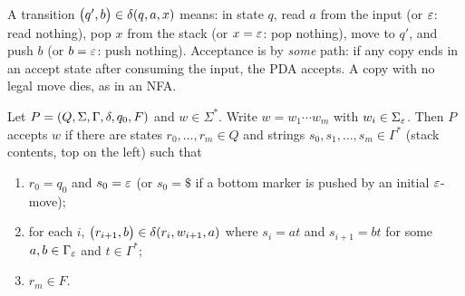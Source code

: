 A transition $\bigl(q',b\bigr)\in\delta(q,a,x)$ means: in state $q$, read
$a$ from the input (or $\varepsilon$: read nothing), pop $x$ from the stack (or
$x=\varepsilon$: pop nothing), move to $q'$, and push $b$ (or $b=\varepsilon$: push
nothing). Acceptance is by \emph{some} path: if any copy ends in an accept
state after consuming the input, the PDA accepts. A copy with no legal move
dies, as in an NFA.

\begin{definition}
Let $P=(Q,\Sigma,\Gamma,\delta,q_0,F)$ and $w\in\Sigma^*$. Write
$w=w_1\cdots w_m$ with $w_i\in\Sigma_\varepsilon$. Then $P$ accepts $w$ if there are
states $r_0,\ldots,r_m\in Q$ and strings $s_0,s_1,\ldots,s_m\in\Gamma^*$
(stack contents, top on the left) such that
\begin{enumerate}
  \item $r_0=q_0$ and $s_0=\varepsilon$ (or $s_0=\mathdollar$ if a bottom marker is pushed by
        an initial $\varepsilon$-move);
  \item for each $i$, $\bigl(r_{i+1},b\bigr)\in\delta(r_i,w_{i+1},a)$
        where $s_i=at$ and $s_{i+1}=bt$ for some $a,b\in\Gamma_\varepsilon$ and
        $t\in\Gamma^*$;
  \item $r_m\in F$.
\end{enumerate}
\end{definition}

